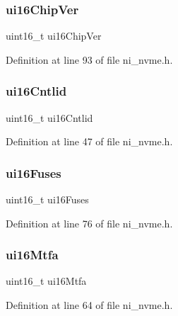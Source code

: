 \subsubsection{\texorpdfstring{ui16ChipVer}{ui16ChipVer}}
{\footnotesize\ttfamily uint16\+\_\+t ui16\+Chip\+Ver}



Definition at line 93 of file ni\+\_\+nvme.\+h.

\mbox{\label{struct__ni__nvme__identify_a1678f7d858c6effd1b7920c7d9be2009}} 
\subsubsection{\texorpdfstring{ui16Cntlid}{ui16Cntlid}}
{\footnotesize\ttfamily uint16\+\_\+t ui16\+Cntlid}



Definition at line 47 of file ni\+\_\+nvme.\+h.

\mbox{\label{struct__ni__nvme__identify_ad8ae14b16fa780e4f4f13d229f67e28b}} 
\subsubsection{\texorpdfstring{ui16Fuses}{ui16Fuses}}
{\footnotesize\ttfamily uint16\+\_\+t ui16\+Fuses}



Definition at line 76 of file ni\+\_\+nvme.\+h.

\mbox{\label{struct__ni__nvme__identify_a36215df4cb766fba4a4d1e2a2eac415b}} 
\subsubsection{\texorpdfstring{ui16Mtfa}{ui16Mtfa}}
{\footnotesize\ttfamily uint16\+\_\+t ui16\+Mtfa}



Definition at line 64 of file ni\+\_\+nvme.\+h.

